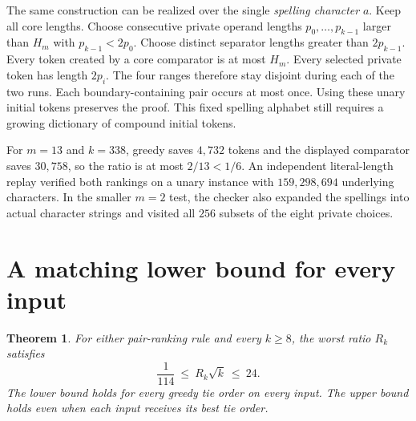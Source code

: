 \documentclass[11pt]{article}
\newtheorem{theorem}{Theorem}
\begin{document}
The same construction can be realized over the single \emph{spelling character} $a$. Keep all core lengths. Choose consecutive private operand lengths $p_0,\ldots,p_{k-1}$ larger than $H_m$ with $p_{k-1}<2p_0$. Choose distinct separator lengths greater than $2p_{k-1}$. Every token created by a core comparator is at most $H_m$. Every selected private token has length $2p_i$. The four ranges therefore stay disjoint during each of the two runs. Each boundary-containing pair occurs at most once. Using these unary initial tokens preserves the proof. This fixed spelling alphabet still requires a growing dictionary of compound initial tokens.

For $m=13$ and $k=338$, greedy saves $4{,}732$ tokens and the displayed comparator saves $30{,}758$, so the ratio is at most $2/13<1/6$. An independent literal-length replay verified both rankings on a unary instance with $159{,}298{,}694$ underlying characters. In the smaller $m=2$ test, the checker also expanded the spellings into actual character strings and visited all $256$ subsets of the eight private choices.

\section{A matching lower bound for every input}
\begin{theorem}\label{th:rate}
For either pair-ranking rule and every $k\ge8$, the worst ratio $R_k$ satisfies
\[
 \frac{1}{114}\ \le\ R_k\sqrt{k}\ \le\ 24 .
\]
The lower bound holds for every greedy tie order on every input. The upper bound holds even when each input receives its best tie order.
\end{theorem}
\end{document}

